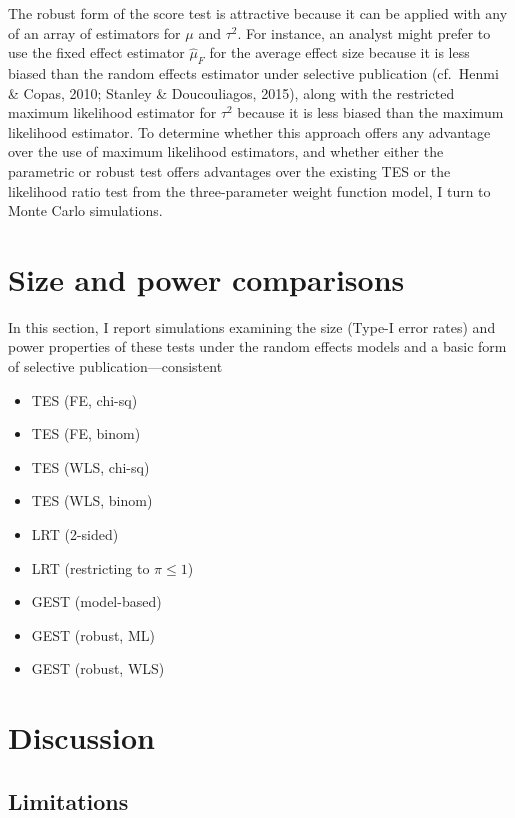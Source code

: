 \documentclass[man,floatsintext]{apa6}
\providecommand{\tightlist}{%
  \setlength{\itemsep}{0pt}\setlength{\parskip}{0pt}}
\begin{document}
The robust form of the score test is attractive because it can be applied with any of an array of estimators for \(\mu\) and \(\tau^2\).
For instance, an analyst might prefer to use the fixed effect estimator \(\hat\mu_F\) for the average effect size because it is less biased than the random effects estimator under selective publication (cf.~Henmi \& Copas, 2010; Stanley \& Doucouliagos, 2015), along with the restricted maximum likelihood estimator for \(\tau^2\) because it is less biased than the maximum likelihood estimator.
To determine whether this approach offers any advantage over the use of maximum likelihood estimators, and whether either the parametric or robust test offers advantages over the existing TES or the likelihood ratio test from the three-parameter weight function model, I turn to Monte Carlo simulations.

\hypertarget{simulations}{%
\section{Size and power comparisons}\label{simulations}}

In this section, I report simulations examining the size (Type-I error rates) and power properties of these tests under the random effects models and a basic form of selective publication---consistent

\begin{itemize}
\tightlist
\item
  TES (FE, chi-sq)
\item
  TES (FE, binom)
\item
  TES (WLS, chi-sq)
\item
  TES (WLS, binom)
\item
  LRT (2-sided)
\item
  LRT (restricting to \(\pi \leq 1\))
\item
  GEST (model-based)
\item
  GEST (robust, ML)
\item
  GEST (robust, WLS)
\end{itemize}

\hypertarget{discussion}{%
\section{Discussion}\label{discussion}}

\hypertarget{limitations}{%
\subsection{Limitations}\label{limitations}}
\end{document}
